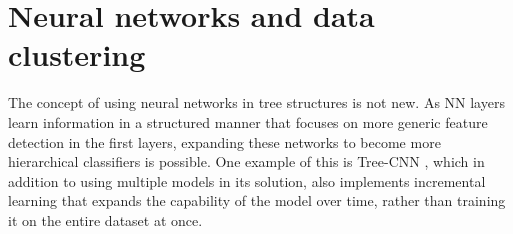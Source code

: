 \section{Neural networks and data clustering}
The concept of using neural networks in tree structures is not new. As NN layers learn information in a structured manner that focuses on more generic feature detection in the first layers, expanding these networks to become more hierarchical classifiers is possible. One example of this is Tree-CNN \cite{roy2018treecnn}, which in addition to using multiple models in its solution, also implements incremental learning that expands the capability of the model over time, rather than training it on the entire dataset at once.




